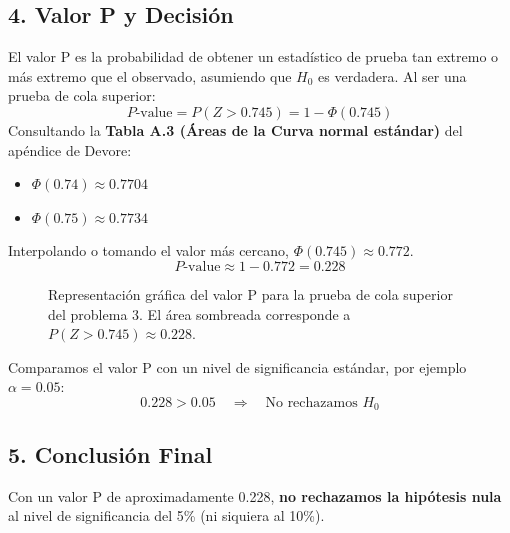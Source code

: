 \documentclass[12pt]{article}
\begin{document}
\subsection*{4. Valor P y Decisión}
El valor P es la probabilidad de obtener un estadístico de prueba tan extremo o más extremo que el observado, asumiendo que $H_0$ es verdadera. Al ser una prueba de cola superior:
$$ P\text{-value} = P(Z > 0.745) = 1 - \Phi(0.745) $$
Consultando la \textbf{Tabla A.3 (Áreas de la Curva normal estándar)} del apéndice de Devore:
\begin{itemize}
    \item $\Phi(0.74) \approx 0.7704$
    \item $\Phi(0.75) \approx 0.7734$
\end{itemize}
Interpolando o tomando el valor más cercano, $\Phi(0.745) \approx 0.772$.
$$ P\text{-value} \approx 1 - 0.772 = 0.228 $$

\begin{figure}[H]
\centering
{}
\caption{Representación gráfica del valor P para la prueba de cola superior del problema 3. El área sombreada corresponde a $P(Z>0.745) \approx 0.228$.}
\end{figure}

Comparamos el valor P con un nivel de significancia estándar, por ejemplo $\alpha = 0.05$:
$$ 0.228 > 0.05 \quad \Rightarrow \quad \text{No rechazamos } H_0 $$

\subsection*{5. Conclusión Final}
Con un valor P de aproximadamente 0.228, \textbf{no rechazamos la hipótesis nula} al nivel de significancia del 5\% (ni siquiera al 10\%).
\end{document}
